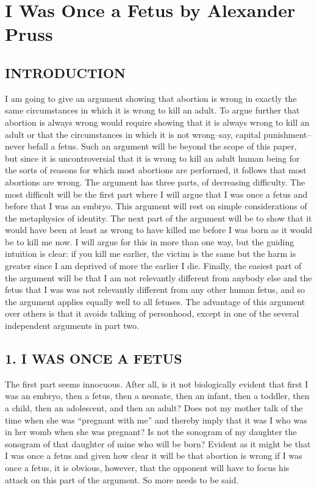 \chapter{I Was Once a Fetus by Alexander Pruss}\autocite{Pruss1}
\label{iwasafetus}
\section{INTRODUCTION}
 
I am going to give an argument showing that abortion is wrong in exactly 
the same circumstances in which it is wrong to kill an adult.  To argue 
further that abortion is always wrong would require showing that it is 
always wrong to kill an adult or that the circumstances in which it is not 
wrong–say, capital punishment–never befall a fetus.  Such an argument 
will be beyond the scope of this paper, but since it is uncontroversial that 
it is wrong to kill an adult human being for the sorts of reasons for which 
most abortions are performed, it follows that most abortions are wrong. 
The argument has three parts, of decreasing difficulty.  The most 
difficult will be the first part where I will argue that I was once a fetus 
and  before  that  I  was  an  embryo.    This  argument  will  rest  on  simple 
considerations  of  the  metaphysics  of  identity.    The  next  part  of  the 
argument will be to show that it would have been at least as wrong to 
have killed me before I was born as it would be to kill me now.  I will 
argue for this in more than one way, but the guiding intuition is clear: if 
you kill me earlier, the victim is the same but the harm is greater since I 
am  deprived  of  more  the  earlier  I  die.    Finally,  the  easiest  part  of  the 
argument will be that I am not relevantly different from anybody else and 
the fetus that I was was not relevantly different from any other human 
fetus, and so the argument applies equally well to all fetuses. 
The advantage of this argument over others is that it avoids talking 
of personhood, except in one of the several independent arguments in 
part two. 
 
 
\section{1. I WAS ONCE A FETUS} 
The first part seems innocuous.  After all, is it not biologically evident 
that first I was an embryo, then a fetus, then a neonate, then an infant, 
then a toddler, then a child, then an adolescent, and then an adult?  Does 
not my mother talk of the time when she was “pregnant with me” and 
thereby  imply  that  it  was  I  who  was  in  her  womb  when  she  was 
pregnant?    Is  not  the  sonogram  of  my  daughter  the  sonogram  of  that 
daughter of mine who will be born?  Evident as it might be that I was 
once a fetus and given how clear it will be that abortion is wrong if I was 
once a fetus, it is obvious, however, that the opponent will have to focus 
his attack on this part of the argument.  So more needs to be said. 

